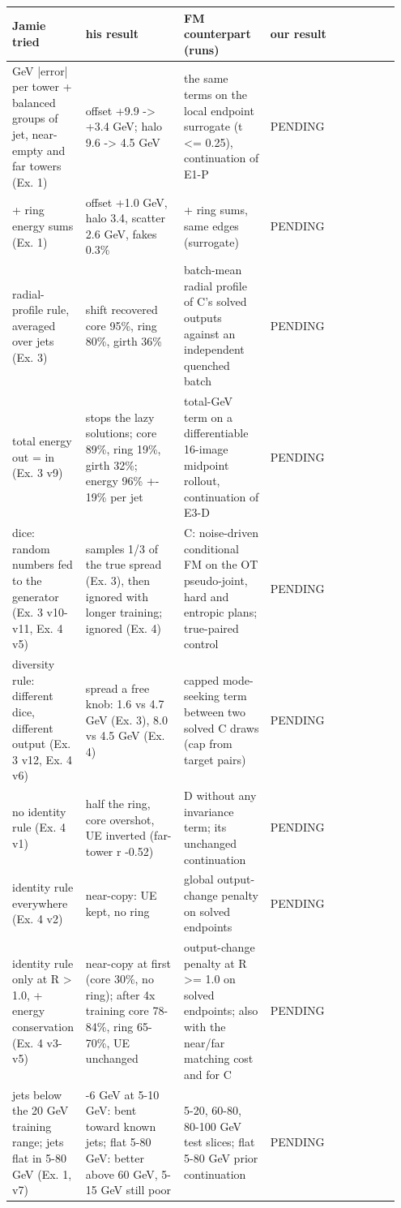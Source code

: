 \tiny
\setlength{\tabcolsep}{2.5pt}
\begin{tabular}{p{0.15\linewidth}p{0.25\linewidth}p{0.22\linewidth}p{0.33\linewidth}}
\toprule
Jamie tried & his result & FM counterpart (runs) & our result \\
\midrule
GeV |error| per tower + balanced groups of jet, near-empty and far towers (Ex. 1) & offset +9.9 -> +3.4 GeV; halo 9.6 -> 4.5 GeV & the same terms on the local endpoint surrogate (t <= 0.25), continuation of E1-P & PENDING \\
+ ring energy sums (Ex. 1) & offset +1.0 GeV, halo 3.4, scatter 2.6 GeV, fakes 0.3\% & + ring sums, same edges (surrogate) & PENDING \\
radial-profile rule, averaged over jets (Ex. 3) & shift recovered core 95\%, ring 80\%, girth 36\% & batch-mean radial profile of C's solved outputs against an independent quenched batch & PENDING \\
total energy out = in (Ex. 3 v9) & stops the lazy solutions; core 89\%, ring 19\%, girth 32\%; energy 96\% +- 19\% per jet & total-GeV term on a differentiable 16-image midpoint rollout, continuation of E3-D & PENDING \\
dice: random numbers fed to the generator (Ex. 3 v10-v11, Ex. 4 v5) & samples 1/3 of the true spread (Ex. 3), then ignored with longer training; ignored (Ex. 4) & C: noise-driven conditional FM on the OT pseudo-joint, hard and entropic plans; true-paired control & PENDING \\
diversity rule: different dice, different output (Ex. 3 v12, Ex. 4 v6) & spread a free knob: 1.6 vs 4.7 GeV (Ex. 3), 8.0 vs 4.5 GeV (Ex. 4) & capped mode-seeking term between two solved C draws (cap from target pairs) & PENDING \\
no identity rule (Ex. 4 v1) & half the ring, core overshot, UE inverted (far-tower r -0.52) & D without any invariance term; its unchanged continuation & PENDING \\
identity rule everywhere (Ex. 4 v2) & near-copy: UE kept, no ring & global output-change penalty on solved endpoints & PENDING \\
identity rule only at R > 1.0, + energy conservation (Ex. 4 v3-v5) & near-copy at first (core 30\%, no ring); after 4x training core 78-84\%, ring 65-70\%, UE unchanged & output-change penalty at R >= 1.0 on solved endpoints; also with the near/far matching cost and for C & PENDING \\
jets below the 20 GeV training range; jets flat in 5-80 GeV (Ex. 1, v7) & -6 GeV at 5-10 GeV: bent toward known jets; flat 5-80 GeV: better above 60 GeV, 5-15 GeV still poor & 5-20, 60-80, 80-100 GeV test slices; flat 5-80 GeV prior continuation & PENDING \\

\end{tabular}

